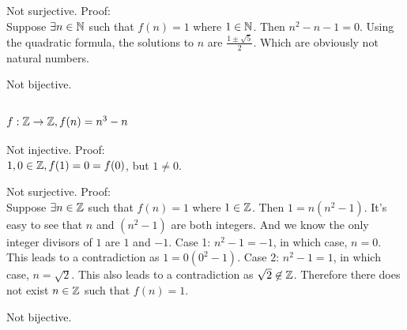         Not surjective. Proof: \\ 
            Suppose $\exists n \in \mathbb{N}$ such that $f(n) = 1$ where $1 \in\mathbb{N}$.
            Then $n^2 - n - 1 = 0$. 
            Using the quadratic formula, 
            the solutions to $n$ are $\frac{1 \pm \sqrt{5}}{2}$.
            Which are obviously not natural numbers.

        Not bijective.

    \newpage
    \subsection{$f: \mathbb{Z} \to \mathbb{Z} , f(n) = n^3 - n$}
        Not injective. Proof: \\ 
            $1,0 \in \mathbb{Z}, f(1)= 0 = f(0)$, but $1 \neq 0$.

        Not surjective. Proof: \\ 
            Suppose $\exists n \in \mathbb{Z}$ such that $f(n) = 1$ where $1 \in\mathbb{Z}$.
            Then $1 = n (n^2 - 1)$.
            It's easy to see that $n$ and $(n^2 - 1)$ are both integers.
            And we know the only integer divisors of $1$ are $1$ and $-1$.
            Case 1: $n^2 - 1 = -1$, in which case, $n = 0$.
            This leads to a contradiction as $1 = 0 (0^2 - 1)$.
            Case 2: $n^2 - 1 = 1$, in which case, $n = \sqrt{2}$.
            This also leads to a contradiction as $\sqrt{2} \not\in \mathbb{Z}$.
            Therefore there does not exist $n \in \mathbb{Z}$ such that $f(n) = 1$.

        Not bijective.

